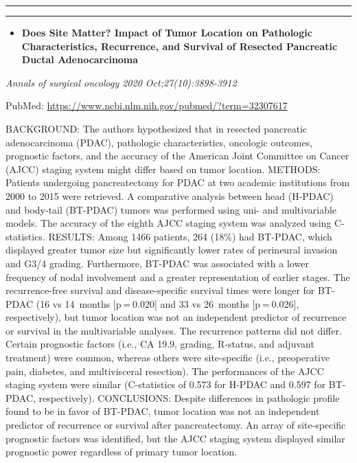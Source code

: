 \documentclass[
]{article}
\providecommand{\tightlist}{%
  \setlength{\itemsep}{0pt}\setlength{\parskip}{0pt}}
\begin{document}
\begin{center}\rule{0.5\linewidth}{0.5pt}\end{center}

\begin{center}\rule{0.5\linewidth}{0.5pt}\end{center}

\begin{itemize}
\tightlist
\item
  \textbf{Does Site Matter? Impact of Tumor Location on Pathologic
  Characteristics, Recurrence, and Survival of Resected Pancreatic
  Ductal Adenocarcinoma}
\end{itemize}

\emph{Annals of surgical oncology 2020 Oct;27(10):3898-3912}

PubMed: \url{https://www.ncbi.nlm.nih.gov/pubmed/?term=32307617}

BACKGROUND: The authors hypothesized that in resected pancreatic
adenocarcinoma (PDAC), pathologic characteristics, oncologic outcomes,
prognostic factors, and the accuracy of the American Joint Committee on
Cancer (AJCC) staging system might differ based on tumor location.
METHODS: Patients undergoing pancreatectomy for PDAC at two academic
institutions from 2000 to 2015 were retrieved. A comparative analysis
between head (H-PDAC) and body-tail (BT-PDAC) tumors was performed using
uni- and multivariable models. The accuracy of the eighth AJCC staging
system was analyzed using C-statistics. RESULTS: Among 1466 patients,
264 (18\%) had BT-PDAC, which displayed greater tumor size but
significantly lower rates of perineural invasion and G3/4 grading.
Furthermore, BT-PDAC was associated with a lower frequency of nodal
involvement and a greater representation of earlier stages. The
recurrence-free survival and disease-specific survival times were longer
for BT-PDAC (16 vs 14~months {[}p = 0.020{]} and 33 vs 26~months
{[}p = 0.026{]}, respectively), but tumor location was not an
independent predictor of recurrence or survival in the multivariable
analyses. The recurrence patterns did not differ. Certain prognostic
factors (i.e., CA 19.9, grading, R-status, and adjuvant treatment) were
common, whereas others were site-specific (i.e., preoperative pain,
diabetes, and multivisceral resection). The performances of the AJCC
staging system were similar (C-statistics of 0.573 for H-PDAC and 0.597
for BT-PDAC, respectively). CONCLUSIONS: Despite differences in
pathologic profile found to be in favor of BT-PDAC, tumor location was
not an independent predictor of recurrence or survival after
pancreatectomy. An array of site-specific prognostic factors was
identified, but the AJCC staging system displayed similar prognostic
power regardless of primary tumor location.
\end{document}
